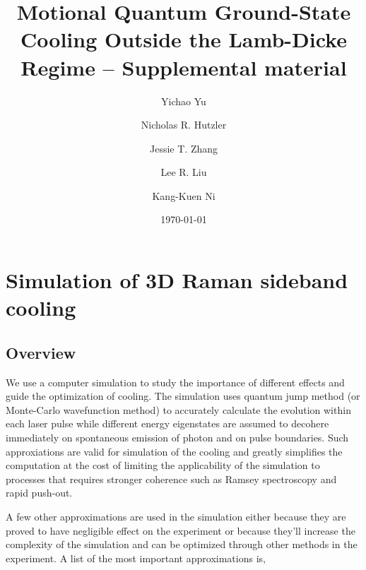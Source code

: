 \documentclass[aps,twocolumn,secnumarabic,balancelastpage,amsmath,amssymb]{revtex4}
\begin{document}
\title{Motional Quantum Ground-State Cooling Outside the Lamb-Dicke Regime -- Supplemental material}
\author{Yichao Yu}
\author{Nicholas R. Hutzler}
\author{Jessie T. Zhang}
\author{Lee R. Liu}
\author{Kang-Kuen Ni}

\date{\today}

\maketitle

\section{Simulation of 3D Raman sideband cooling}

\subsection{Overview}

We use a computer simulation to study the importance of different effects
and guide the optimization of cooling.
The simulation uses quantum jump method\cite{Chretien2014} (or Monte-Carlo wavefunction method)
to accurately calculate the evolution within each laser pulse while different energy eigenstates
are assumed to decohere immediately on spontaneous emission of photon and on pulse boundaries.
Such approxiations are valid for simulation of the cooling and greatly simplifies the computation
at the cost of limiting the applicability of the simulation to processes that requires stronger
coherence such as Ramsey spectroscopy and rapid push-out.

A few other approximations are used in the simulation either because they are proved to have
negligible effect on the experiment or because they'll increase the complexity of the simulation
and can be optimized through other methods in the experiment.
A list of the most important approximations is,
\end{document}

